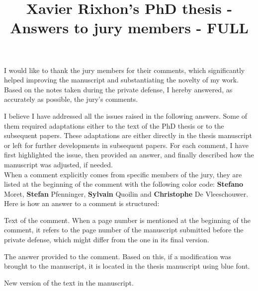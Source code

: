 \documentclass[12pt,a4paper]{article}
\title{\vspace{-1cm}
\begin{flushleft} {\sffamily Xavier Rixhon's PhD thesis - Answers to jury members - FULL}\end{flushleft}}
\date{\vspace{-1.7cm}\begin{flushleft}\sffamily Exploration of uncertainty-aware energy transition pathways - Reinforcement learning and principal component analysis-based methods\end{flushleft}}
\begin{document}
\maketitle

I would like to thank the jury members for their comments, which significantly helped improving the manuscript and substantiating the novelty of my work. Based on the notes taken during the private defense, I hereby answered, as accurately as possible, the jury's comments. 

I believe I have addressed all the issues raised in the following answers. Some of them required adaptations either to the text of the PhD thesis or to the subsequent papers. These adaptations are either directly in the thesis manuscript or left for further developments in subsequent papers. For each comment, I have first highlighted the issue, then provided an answer, and finally described how the manuscript was adjusted, if needed.\\

When a comment explicitly comes from specific members of the jury, they are listed at the beginning of the comment with the following color code: {\color{orange} \textbf{Stefano} Moret}, {\color{teal} \textbf{Stefan} Pfenninger}, {\color{purple} \textbf{Sylvain} Quoilin} and {\color{violet} \textbf{Christophe} De Vleeschouwer}. Here is how an answer to a comment is structured:

\begin{mdframed}[style=comment] %
Text of the comment. When a page number is mentioned at the beginning of the comment, it refers to the page number of the manuscript submitted before the private defense, which might differ from the one in its final version.
\end{mdframed}

\noindent The answer provided to the comment. Based on this, if a modification was brought to the manuscript, it is located in the thesis manuscript using {\color{blue} blue font}.

\begin{mdframed}[style=manuscript] %
New version of the text in the manuscript.
\end{mdframed}


\clearpage
\tableofcontents
\end{document}
